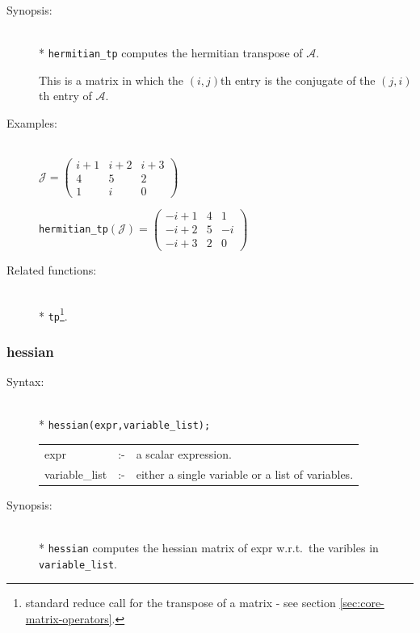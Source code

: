 {\begin{description}
\item[Synopsis:]\mbox{}\\*
         \texttt{hermitian\_tp} computes the hermitian transpose of $\mathcal{A}$.

This is a matrix in which the $(i,j)$th entry is the conjugate of the $(j,i)$th
entry of $\mathcal{A}$.

\item[Examples:]\mbox{}\\
  \(\mathcal{J} = \begin{pmatrix} i+1 & i+2 & i+3 \\ 4 & 5 & 2 \\ 1 &
    i & 0 \end{pmatrix}\)

  \texttt{hermitian\_tp}\((\mathcal{J})  =
  \begin{pmatrix} -i+1 & 4 & 1 \\ -i+2 & 5 & -i \\-i+3 & 2 & 0 \end{pmatrix}\)

\item[Related functions:]\mbox{}\\*
\texttt{tp}\footnote{standard reduce call for the
transpose of a matrix - see section \protect\ref{sec:core-matrix-operators}.}.
\end{description}


\subsubsection{hessian}
\label{linalg:hessian}
\hypertarget{operator:HESSIAN}{}

\begin{description}
\item[Syntax:]\mbox{}\\*
\texttt{hessian(expr,variable\_list);}\\[2mm]
\begin{tabular}{l l l}
expr           &:-& a scalar expression. \\
variable\_list &:-& either a single variable or a list of variables.
\end{tabular}

\item[Synopsis:]\mbox{}\\*
                \texttt{hessian} computes the hessian matrix of expr w.r.t.\
                the varibles in \texttt{variable\_list}.


\end{description}}
